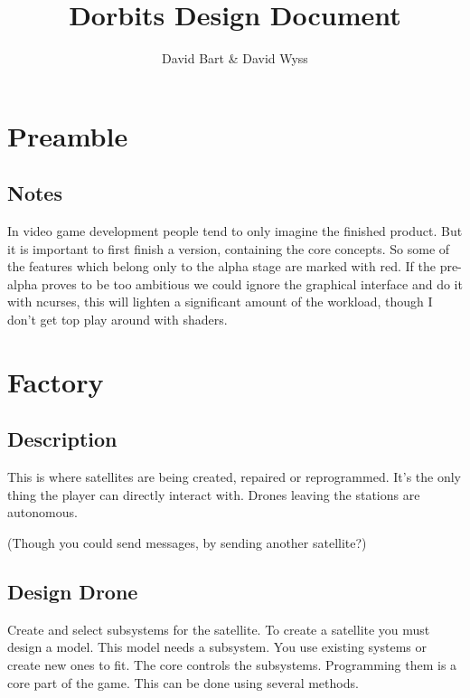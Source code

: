 \documentclass[a4paper]{scrreprt}
\title{Dorbits Design Document}
\author{David Bart & David Wyss}
\begin{document}

\newenvironment{alpha-feature}{\color{alpha-color}}{}

\maketitle
\tableofcontents

\chapter{Preamble}
    \section{Notes}
    In video game development people tend to only imagine the finished product. But it is important to first finish a version, containing the core concepts. So some of the features which belong only to the alpha stage are marked with red. If the pre-alpha proves to be too ambitious we could ignore the graphical interface and do it with ncurses, this will lighten a significant amount of the workload, though I don't get top play around with shaders. 

\chapter{Factory}
    \section{Description}
        This is where satellites are being created, repaired or reprogrammed. 
        It's the only thing the player can directly interact with.
        Drones leaving the stations are autonomous. \begin{alpha-feature}(Though you could send messages, by sending another satellite?)\end{alpha-feature}
    \section{Design Drone}
        Create and select subsystems for the satellite.
        To create a satellite you must design a model. This model needs a subsystem.
        You use existing systems or create new ones to fit. 
        The core controls the subsystems. Programming them is a core part of the game. This can be done using several methods.
\end{document}
